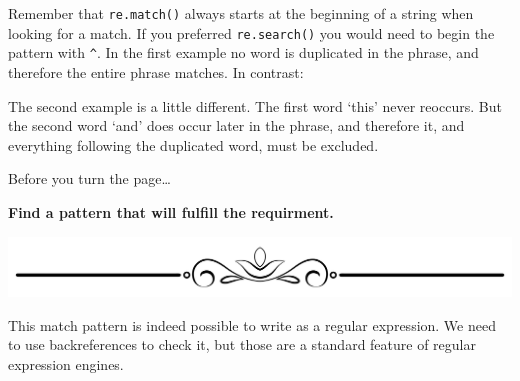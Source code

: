 \begin{Shaded}
\begin{Highlighting}[]
\OperatorTok{=} 
\OperatorTok{==}
\end{Highlighting}
\end{Shaded}

Remember that \texttt{re.match()} always starts at the beginning of a
string when looking for a match. If you preferred \texttt{re.search()}
you would need to begin the pattern with \texttt{\^{}}. In the first
example no word is duplicated in the phrase, and therefore the entire
phrase matches. In contrast:

\begin{Shaded}
\begin{Highlighting}[]
\OperatorTok{=} 
\OperatorTok{==} 
\end{Highlighting}
\end{Shaded}

The second example is a little different. The first word `this' never
reoccurs. But the second word `and' does occur later in the phrase, and
therefore it, and everything following the duplicated word, must be
excluded.

Before you turn the page\ldots{}

\textbf{Find a pattern that will fulfill the requirment.}

\includegraphics{images/Elegant-Flourish-Frame-Extrapolated-19.svg}

\newpage

This match pattern is indeed possible to write as a regular expression.
We need to use backreferences to check it, but those are a standard
feature of regular expression engines.

\begin{Shaded}
\begin{Highlighting}[]
\OperatorTok{=} 
\end{Highlighting}
\end{Shaded}

